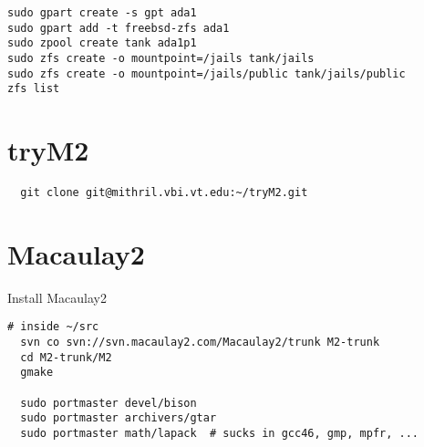 \documentclass[a4paper]{article}
\begin{document}
\begin{verbatim}
sudo gpart create -s gpt ada1
sudo gpart add -t freebsd-zfs ada1
sudo zpool create tank ada1p1
sudo zfs create -o mountpoint=/jails tank/jails
sudo zfs create -o mountpoint=/jails/public tank/jails/public
zfs list
\end{verbatim}

\section{tryM2}
\begin{verbatim}
  git clone git@mithril.vbi.vt.edu:~/tryM2.git
\end{verbatim}

\section{Macaulay2}
Install Macaulay2

\begin{verbatim}
# inside ~/src
  svn co svn://svn.macaulay2.com/Macaulay2/trunk M2-trunk
  cd M2-trunk/M2
  gmake

  sudo portmaster devel/bison
  sudo portmaster archivers/gtar
  sudo portmaster math/lapack  # sucks in gcc46, gmp, mpfr, ...
\end{verbatim}
\end{document}
